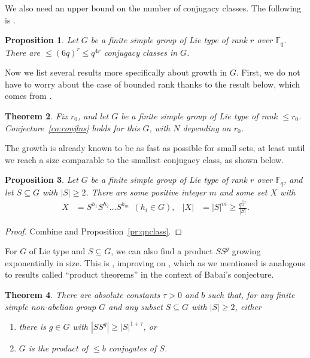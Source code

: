 \documentclass[a4paper]{article}
\newtheorem{proposition}{Proposition}[section]
\newtheorem{theorem}[proposition]{Theorem}
\theoremstyle{definition}
\numberwithin{equation}{section}
\begin{document}
We also need an upper bound on the number of conjugacy classes. The following is \cite[Thm.~1]{LP97}.

\begin{proposition}\label{pr:fewclass}
Let $G$ be a finite simple group of Lie type of rank $r$ over $\mathbb{F}_{q}$. There are $\leq(6q)^{r}\leq q^{4r}$ conjugacy classes in $G$.
\end{proposition}

Now we list several results more specifically about growth in $G$. First, we do not have to worry about the case of bounded rank thanks to the result below, which comes from \cite[Thm.~1.3]{GPSS13}.

\begin{theorem}\label{th:boundr}
Fix $r_{0}$, and let $G$ be a finite simple group of Lie type of rank $\leq r_{0}$. Conjecture~\ref{co:conjlns} holds for this $G$, with $N$ depending on $r_{0}$.
\end{theorem}

The growth is already known to be as fast as possible for small sets, at least until we reach a size comparable to the smallest conjugacy class, as shown below.

\begin{proposition}\label{pr:smallgrow}
Let $G$ be a finite simple group of Lie type of rank $r$ over $\mathbb{F}_{q}$, and let $S\subseteq G$ with $|S|\geq 2$. There are some positive integer $m$ and some set $X$ with
\begin{align*}
X & =S^{h_{1}}S^{h_{2}}\ldots S^{h_{m}} \ \ (h_{i}\in G), & |X| & =|S|^{m}\geq\frac{q^{\frac{1}{2}r}}{|S|}.
\end{align*}
\end{proposition}

\begin{proof}
Combine \cite[Lemma 3.1]{GPSS13} and Proposition~\ref{pr:qnclass}.
\end{proof}

For $G$ of Lie type and $S\subseteq G$, we can also find a product $SS^{g}$ growing exponentially in size. This is \cite[Thm.~1.6]{GLPS24}, improving on \cite[Thm.~1.4]{GPSS13}, which as we mentioned is analogous to results called ``product theorems'' in the context of Babai's conjecture.

\begin{theorem}\label{th:ptc}
There are absolute constants $\tau>0$ and $b$ such that, for any finite simple non-abelian group $G$ and any subset $S\subseteq G$ with $|S|\geq 2$, either
\begin{enumerate}[(1)]
\item there is $g\in G$ with $|SS^{g}|\geq|S|^{1+\tau}$, or
\item $G$ is the product of $\leq b$ conjugates of $S$.
\end{enumerate}
\end{theorem}
\end{document}
